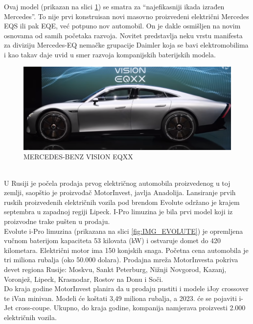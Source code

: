 \documentclass[a4paper]{article}
\begin{document}
    Ovaj model (prikazan na slici \ref{fig:IMG_Mercedes}) se smatra za  “najefikasniji ikada izrađen Mercedes”. To nije prvi konstruisan novi masovno proizvedeni električni Mercedes EQS ili pak EQE, već potpuno nov automobil. On je dakle osmišljen na novim osnovama od samih početaka razvoja. Novitet predstavlja neku vrstu manifesta za diviziju Mercedes-EQ nemačke grupacije Daimler koja se bavi elektromobilima i kao takav daje uvid u smer razvoja kompanijskih baterijskih modela.\\ 
 

\begin{figure}[h]
        \centering
        \includegraphics[width=\linewidth]{Vision.png}
        \caption{MERCEDES-BENZ VISION EQXX}
        \label{fig:IMG_Mercedes}
        \end{figure}


\\

    U Rusiji je počela prodaja prvog električnog automobila proizvedenog u toj zemlji, saopštio je proizvođač MotorInvest, javlja Anadolija. Lansiranje prvih ruskih proizvedenih električnih vozila pod brendom Evolute održano je krajem septembra u zapadnoj regiji Lipeck. I-Pro limuzina je bila prvi model koji iz proizvodne trake pušten u prodaju.\\
    Evolute i-Pro limuzina (prikazana na slici \ref{fig:IMG_EVOLUTE}) je opremljena vučnom baterijom kapaciteta 53 kilovata (kW) i ostvaruje domet do 420 kilometara. Električni motor ima 150 konjskih snaga.
    Početna cena automobila je tri miliona rubalja (oko 50.000 dolara). Prodajna mreža MotorInvesta pokriva devet regiona Rusije: Moskvu, Sankt Peterburg, Nižnji Novgorod, Kazanj, Voronjež, Lipeck, Krasnodar, Rostov na Donu i Soči.\\
    Do kraja godine MotorInvest planira da u prodaju pustiti i modele iJoy crossover te iVan minivan. Modeli će koštati 3,49 miliona rubalja, a 2023. će se pojaviti i-Jet cross-coupe. Ukupno, do kraja godine, kompanija namjerava proizvesti 2.000 električnih vozila.\\ 
    
\end{document}
